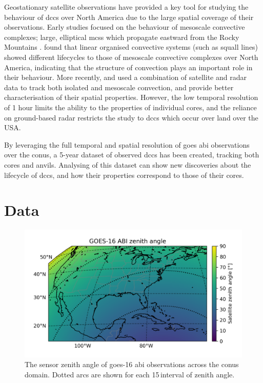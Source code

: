 Geostationary satellite observations have provided a key tool for studying the behaviour of \acrshort{dcc}s over North America due to the large spatial coverage of their observations.
Early studies focused on the behaviour of mesoscale convective complexes; large, elliptical \acrshort{mcs}s which propagate eastward from the Rocky Mountains \citep{maddox_mesoscale_1980, augustine_mesoscale_1988, augustine_mesoscale_1991}.
\citet{tsakraklides_global_2003a} found that linear organised convective systems (such as squall lines) showed different lifecycles to those of mesoscale convective complexes over North America, indicating that the structure of convection plays an important role in their behaviour.
More recently, \citet{feng_spatiotemporal_2019} and \citet{li_high-resolution_2021} used a combination of satellite and radar data to track both isolated and mesoscale convection, and provide better characterisation of their spatial properties.
However, the low temporal resolution of 1 hour limits the ability to the properties of individual cores, and the reliance on ground-based radar restricts the study to \acrshort{dcc}s which occur over land over the USA.

By leveraging the full temporal and spatial resolution of \acrshort{goes} \acrshort{abi} observations over the \acrshort{conus}, a 5-year dataset of observed \acrshort{dcc}s has been created, tracking both cores and anvils.
Analysing of this dataset can show new discoveries about the lifecycle of \acrshort{dcc}s, and how their properties correspond to those of their cores.

\section{Data}

\begin{figure}[tp]
    \centering
    \includegraphics[width=\textwidth]{figures/chapter2_01.png}
    \caption[
    The sensor zenith angle of \acrshort{goes}-16 \acrshort{abi} observations across the \acrshort{conus} domain
    ]{
    The sensor zenith angle of \acrshort{goes}-16 \acrshort{abi} observations across the \acrshort{conus} domain. Dotted arcs are shown for each 15\,\textdegree interval of zenith angle.
    }
    \label{fig:abi_zenith_angles}
\end{figure}


